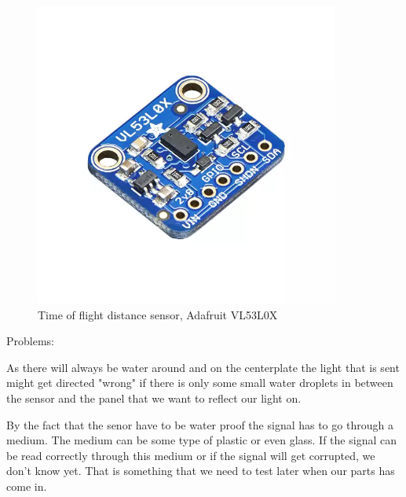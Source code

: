  \begin{figure}[H]
\begin{center}
	\includegraphics[width = 10cm]{Figures/Adafruit_height_sensor.png}
	\caption{Time of flight distance sensor, Adafruit VL53L0X}
	\label{micro_lidar}
\end{center}
\end{figure}
Problems: 

As there will always be water around and on the centerplate the light that is sent might get directed "wrong" if there is only some small water droplets in between the sensor and the panel that we want to reflect our light on. 

By the fact that the senor have to be water proof the signal has to go through a medium. The medium can be some type of plastic or even glass.  
If the signal can be read correctly through this medium or if the signal will get corrupted, we don't know yet. That is something that we need to test later when our parts has come in. 



